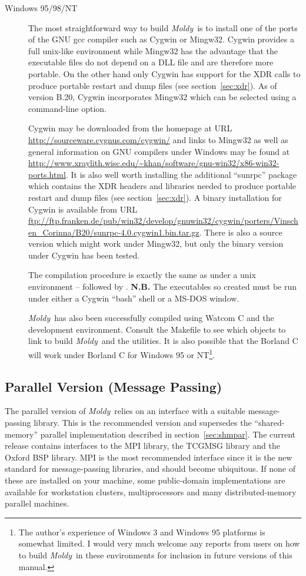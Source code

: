 \documentclass[a4paper,twoside]{report}
\newcommand{\moldy}{\emph{Moldy}}
\begin{document}
\begin{description}
\item[Windows 95/98/NT] The most straightforward way to build \moldy\ is
  to install one of the ports of the GNU gcc compiler such as Cygwin
  or Mingw32.  Cygwin provides a full unix-like environment while
  Mingw32 has the advantage that the executable files do not depend on
  a DLL file and are therefore more portable.  On the other hand only
  Cygwin has support for the XDR calls to produce portable restart and 
  dump files (see section~\ref{sec:xdr}).  As of version B.20, Cygwin
  incorporates Mingw32 which can be selected using a command-line option.
  
  Cygwin may be downloaded from the homepage at URL
  \url{http://sourceware.cygnus.com/cygwin/} and links to Mingw32 as
  well as general information on GNU compilers under Windows may be
  found at
  \url{http://www.xraylith.wisc.edu/~khan/software/gnu-win32/x86-win32-ports.html}.
  It is also well worth installing the additional ``sunrpc'' package
  which contains the XDR headers and libraries needed to produce
  portable restart and dump files (see section~\ref{sec:xdr}).  A
  binary installation for Cygwin is available from URL
  \url{ftp://ftp.franken.de/pub/win32/develop/gnuwin32/cygwin/porters/Vinschen_Corinna/B20/sunrpc-4.0.cygwin1.bin.tar.gz}.
  There is also a source version which might work under Mingw32, but
  only the binary version under Cygwin has been tested.

  The compilation procedure is exactly the same as under a unix
  environment --  followed by . \textbf{N.B.}
  The executables so created must be run under either a Cygwin
  ``bash'' shell or a MS-DOS window.  

  \moldy\ has also been successfully compiled using Watcom C and the
  development environment.  Consult the Makefile to see which objects
  to link to build \moldy\ and the utilities. It is also possible that
  the Borland C  will work under Borland C for
  Windows 95 or NT\footnote{The author's experience of Windows 3 and
    Windows 95 platforms is somewhat limited.  I would very much
    welcome any reports from users on how to build \moldy\ in these
    environments for inclusion in future versions of this manual.}.


\end{description}

\subsection{Parallel Version (Message Passing)}
\label{sec:spmdpar}
The parallel version of \moldy\ relies on an interface with a suitable
message-passing library.  This is the recommended version and
supersedes the ``shared-memory'' parallel implementation described in
section~\ref{sec:shmpar}.  The current release contains interfaces to
the MPI library\cite{mpi:94}, the TCGMSG library and the Oxford BSP
library.  MPI is the most recommended interface since it is the new
standard for message-passing libraries, and should become ubiquitous.
If none of these are installed on your machine, some public-domain
implementations are available for workstation clusters,
multiprocessors and many distributed-memory parallel machines.
\end{document}
